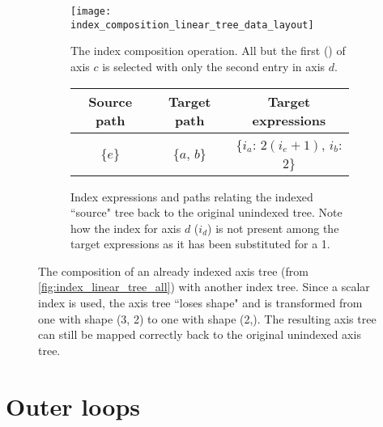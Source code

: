 \documentclass[thesis]{subfiles}
\begin{document}
\begin{figure}[h]
  \centering
  \begin{subfigure}{\textwidth}
    \centering
    \texttt{[image: index\_composition\_linear\_tree\_data\_layout]}
    \caption{
      The index composition operation.
      All but the first () of axis $c$ is selected with only the second entry in axis $d$.
    }
    \label{fig:index_composition_linear_tree_data_layout}
  \end{subfigure}

  \vspace{1em}

  \begin{subfigure}{\textwidth}
    \centering
    \begin{tabular}{|c|c|c|}
      \hline
      \textbf{Source path} & \textbf{Target path} & \textbf{Target expressions} \\
      \hline
      \{$e$\} & \{$a$, $b$\} & \{$i_a$: $2 (i_e+1)$, $i_b$: $2$\} \\
      \hline
    \end{tabular}
    \caption{
      Index expressions and paths relating the indexed ``source" tree back to the original unindexed tree.
      Note how the index for axis $d$ ($i_d$) is not present among the target expressions as it has been substituted for a 1.
    }
    \label{fig:index_composition_linear_tree_exprs}
  \end{subfigure}

  \caption{
    The composition of an already indexed axis tree (from \cref{fig:index_linear_tree_all}) with another index tree.
    Since a scalar index is used, the axis tree ``loses shape" and is transformed from one with shape (3, 2) to one with shape (2,).
    The resulting axis tree can still be mapped correctly back to the original unindexed axis tree.
  }
  \label{fig:index_composition_linear_tree_all}
\end{figure}

\section{Outer loops}
\label{sec:outer_loops}
\end{document}
